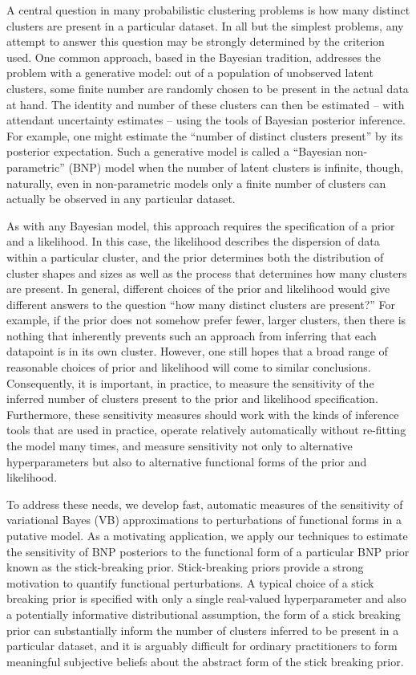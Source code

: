 A central question in many probabilistic clustering problems is how many
distinct clusters are present in a particular dataset. In all but the simplest
problems, any attempt to answer this question may be strongly determined by the
criterion used. One common approach, based in the Bayesian tradition, addresses
the problem with a generative model: out of a population of unobserved latent
clusters, some finite number are randomly chosen to be present in the actual
data at hand. The identity and number of these clusters can then be estimated –
with attendant uncertainty estimates – using the tools of Bayesian posterior
inference. For example, one might estimate the “number of distinct clusters
present” by its posterior expectation. Such a generative model is called a
“Bayesian non-parametric” (BNP) model when the number of latent clusters is
infinite, though, naturally, even in non-parametric models only a finite number
of clusters can actually be observed in any particular dataset.

As with any Bayesian model, this approach requires the specification of a prior
and a likelihood. In this case, the likelihood describes the dispersion of data
within a particular cluster, and the prior determines both the distribution of
cluster shapes and sizes as well as the process that determines how many
clusters are present. In general, different choices of the prior and likelihood
would give different answers to the question “how many distinct clusters are
present?” For example, if the prior does not somehow prefer fewer, larger
clusters, then there is nothing that inherently prevents such an approach from
inferring that each datapoint is in its own cluster. However, one still hopes
that a broad range of reasonable choices of prior and likelihood will come to
similar conclusions. Consequently, it is important, in practice, to measure the
sensitivity of the inferred number of clusters present to the prior and
likelihood specification. Furthermore, these sensitivity measures should work
with the kinds of inference tools that are used in practice, operate relatively
automatically without re-fitting the model many times, and measure sensitivity
not only to alternative hyperparameters but also to alternative functional forms
of the prior and likelihood.

To address these needs, we develop fast, automatic measures of the sensitivity
of variational Bayes (VB) approximations to perturbations of functional forms in
a putative model. As a motivating application, we apply our techniques to
estimate the sensitivity of BNP posteriors to the functional form of a
particular BNP prior known as the stick-breaking prior. Stick-breaking priors
provide a strong motivation to quantify functional perturbations. A typical
choice of a stick breaking prior is specified with only a single real-valued
hyperparameter and also a potentially informative distributional assumption, the
form of a stick breaking prior can substantially inform the number of clusters
inferred to be present in a particular dataset, and it is arguably difficult for
ordinary practitioners to form meaningful subjective beliefs about the abstract
form of the stick breaking prior.

